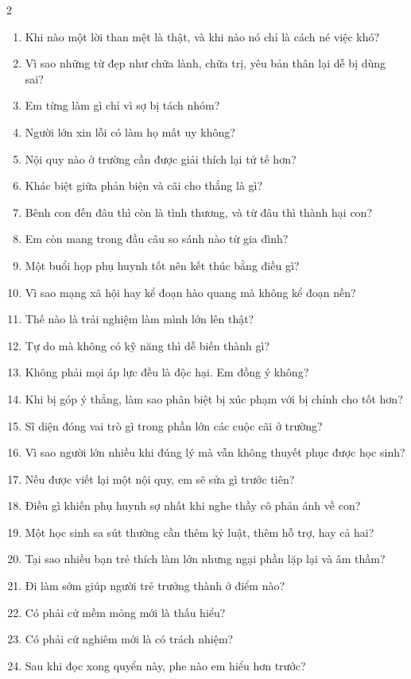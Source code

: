 \begin{multicols}{2}
\begin{enumerate}[leftmargin=1.2cm]
  \item Khi nào một lời than mệt là thật, và khi nào nó chỉ là cách né việc khó?
  \item Vì sao những từ đẹp như chữa lành, chữa trị, yêu bản thân lại dễ bị dùng sai?
  \item Em từng làm gì chỉ vì sợ bị tách nhóm?
  \item Người lớn xin lỗi có làm họ mất uy không?
  \item Nội quy nào ở trường cần được giải thích lại tử tế hơn?
  \item Khác biệt giữa phản biện và cãi cho thắng là gì?
  \item Bênh con đến đâu thì còn là tình thương, và từ đâu thì thành hại con?
  \item Em còn mang trong đầu câu so sánh nào từ gia đình?
  \item Một buổi họp phụ huynh tốt nên kết thúc bằng điều gì?
  \item Vì sao mạng xã hội hay kể đoạn hào quang mà không kể đoạn nền?
  \item Thế nào là trải nghiệm làm mình lớn lên thật?
  \item Tự do mà không có kỹ năng thì dễ biến thành gì?
  \item Không phải mọi áp lực đều là độc hại. Em đồng ý không?
  \item Khi bị góp ý thẳng, làm sao phân biệt bị xúc phạm với bị chỉnh cho tốt hơn?
  \item Sĩ diện đóng vai trò gì trong phần lớn các cuộc cãi ở trường?
  \item Vì sao người lớn nhiều khi đúng lý mà vẫn không thuyết phục được học sinh?
  \item Nếu được viết lại một nội quy, em sẽ sửa gì trước tiên?
  \item Điều gì khiến phụ huynh sợ nhất khi nghe thầy cô phản ánh về con?
  \item Một học sinh sa sút thường cần thêm kỷ luật, thêm hỗ trợ, hay cả hai?
  \item Tại sao nhiều bạn trẻ thích làm lớn nhưng ngại phần lặp lại và âm thầm?
  \item Đi làm sớm giúp người trẻ trưởng thành ở điểm nào?
  \item Có phải cứ mềm mỏng mới là thấu hiểu?
  \item Có phải cứ nghiêm mới là có trách nhiệm?
  \item Sau khi đọc xong quyển này, phe nào em hiểu hơn trước?
\end{enumerate}
\end{multicols}

